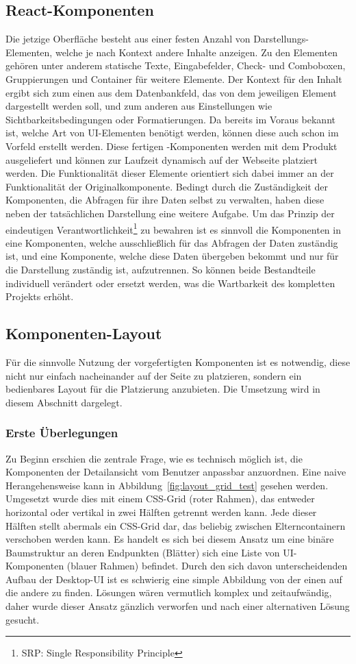\subsection{React-Komponenten}
Die jetzige Oberfläche besteht aus einer festen Anzahl von Darstellungs-Elementen, welche je nach Kontext andere Inhalte anzeigen. Zu den Elementen gehören unter anderem statische Texte, Eingabefelder, Check- und Comboboxen, Gruppierungen und Container für weitere Elemente. Der Kontext für den Inhalt ergibt sich zum einen aus dem Datenbankfeld, das von dem jeweiligen Element dargestellt werden soll, und zum anderen aus Einstellungen wie Sichtbarkeitsbedingungen oder Formatierungen. Da bereits im Voraus bekannt ist, welche Art von UI-Elementen benötigt werden, können diese auch schon im Vorfeld erstellt werden. Diese fertigen -Komponenten werden mit dem Produkt ausgeliefert und können zur Laufzeit dynamisch auf der Webseite platziert werden. Die Funktionalität dieser Elemente orientiert sich dabei immer an der Funktionalität der Originalkomponente.
Bedingt durch die Zuständigkeit der Komponenten, die Abfragen für ihre Daten selbst zu verwalten, haben diese neben der tatsächlichen Darstellung eine weitere Aufgabe. Um das Prinzip der eindeutigen Verantwortlichkeit\footnote{SRP: Single Responsibility Principle} zu bewahren ist es sinnvoll die Komponenten in eine Komponenten, welche ausschließlich für das Abfragen der Daten zuständig ist, und eine Komponente, welche diese Daten übergeben bekommt und nur für die Darstellung zuständig ist, aufzutrennen. So können beide Bestandteile individuell verändert oder ersetzt werden, was die Wartbarkeit des kompletten Projekts erhöht.

\subsection{Komponenten-Layout}
Für die sinnvolle Nutzung der vorgefertigten Komponenten ist es notwendig, diese nicht nur einfach nacheinander auf der Seite zu platzieren, sondern ein bedienbares Layout für die Platzierung anzubieten. Die Umsetzung wird in diesem Abschnitt dargelegt.

\subsubsection{Erste Überlegungen}
Zu Beginn erschien die zentrale Frage, wie es technisch möglich ist, die Komponenten der Detailansicht vom Benutzer anpassbar anzuordnen. Eine naive Herangehensweise kann in Abbildung~\ref{fig:layout_grid_test} gesehen werden. Umgesetzt wurde dies mit einem CSS-Grid (roter Rahmen), das entweder horizontal oder vertikal in zwei Hälften getrennt werden kann. Jede dieser Hälften stellt abermals ein CSS-Grid dar, das beliebig zwischen Elterncontainern verschoben werden kann. Es handelt es sich bei diesem Ansatz um eine binäre Baumstruktur an deren Endpunkten (Blätter) sich eine Liste von UI-Komponenten (blauer Rahmen) befindet. Durch den sich davon unterscheidenden Aufbau der Desktop-UI ist es schwierig eine simple Abbildung von der einen auf die andere zu finden. Lösungen wären vermutlich komplex und zeitaufwändig, daher wurde dieser Ansatz gänzlich verworfen und nach einer alternativen Lösung gesucht.

